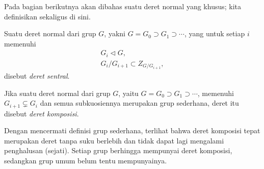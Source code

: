 Pada bagian berikutnya akan dibahas suatu deret normal yang khusus; kita definisikan sekaligus di sini.
\begin{definition}\label{def:central-series}
	Suatu deret normal dari grup $G$, yakni $G = G_0 \supset G_1 \supset \cdots$, yang untuk setiap $i$ memenuhi
	\begin{gather*}
		G_i \lhd G, \\
		G_i/G_{i+1} \subset Z_{G/G_{i+1}},
	\end{gather*}
	disebut \emph{deret sentral}.
\end{definition}

\begin{definition}\label{def:composition-series}
	Jika suatu deret normal dari grup $G$, yaitu $G = G_0 \supset G_1 \supset \cdots$, memenuhi $G_{i+1} \subsetneq G_i$ dan semua subkuosiennya merupakan grup sederhana, deret itu disebut \emph{deret komposisi}.
\end{definition}
Dengan mencermati definisi grup sederhana, terlihat bahwa deret komposisi tepat merupakan deret tanpa suku berlebih dan tidak dapat lagi mengalami penghalusan (sejati). Setiap grup berhingga mempunyai deret komposisi, sedangkan grup umum belum tentu mempunyainya.

